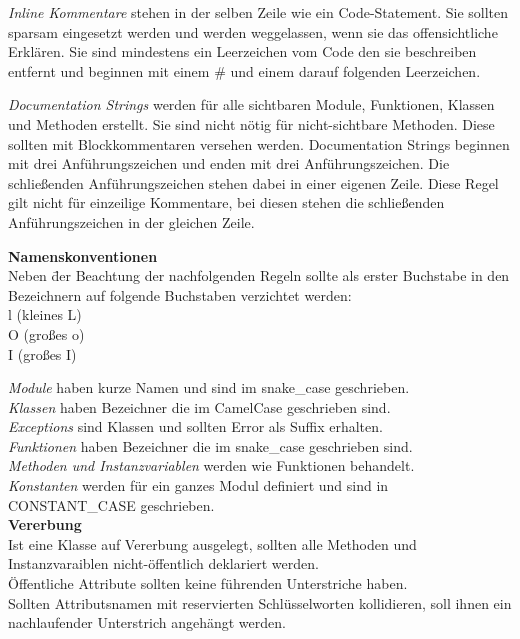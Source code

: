 \textit{Inline Kommentare} stehen in der selben Zeile wie ein Code-Statement. Sie sollten sparsam eingesetzt werden und werden weggelassen, wenn sie das offensichtliche Erklären. Sie sind mindestens ein Leerzeichen vom Code den sie beschreiben entfernt und beginnen mit einem \# und einem darauf folgenden Leerzeichen. 

\textit{Documentation Strings} werden für alle sichtbaren Module, Funktionen, Klassen und Methoden erstellt. Sie sind nicht nötig für nicht-sichtbare Methoden. Diese sollten mit Blockkommentaren versehen werden. Documentation Strings beginnen mit drei Anführungszeichen und enden mit drei Anführungszeichen. Die schließenden Anführungszeichen stehen dabei in einer eigenen Zeile. Diese Regel gilt nicht für einzeilige Kommentare, bei diesen stehen die schließenden Anführungszeichen in der gleichen Zeile. \\
\begin{tabbing}
\textbf{Namenskonventionen}\\
Neben \= der Beachtung der nachfolgenden Regeln sollte als erster Buchstabe in den \\
Bezeichnern auf folgende Buchstaben verzichtet werden:\\
\> l (kleines L) \\
\> O (großes o)\\
\> I (großes I)
\end{tabbing}
\textit{Module} haben kurze Namen und sind im snake\_case geschrieben. \\
\textit{Klassen} haben Bezeichner die im CamelCase geschrieben sind.\\
\textit{Exceptions} sind Klassen und sollten \glqq Error\grqq\: als Suffix erhalten.\\
\textit {Funktionen} haben Bezeichner die im snake\_case geschrieben sind.\\
\textit{Methoden und Instanzvariablen} werden wie Funktionen behandelt.\\
\textit{Konstanten} werden für ein ganzes Modul definiert und sind in CONSTANT\_CASE geschrieben.\\

\textbf{Vererbung}\\
Ist eine Klasse auf Vererbung ausgelegt, sollten alle Methoden und Instanzvaraiblen nicht-öffentlich deklariert werden.\\
Öffentliche Attribute sollten keine führenden Unterstriche haben.\\
Sollten Attributsnamen mit reservierten Schlüsselworten kollidieren, soll ihnen ein nachlaufender Unterstrich angehängt werden.\\

